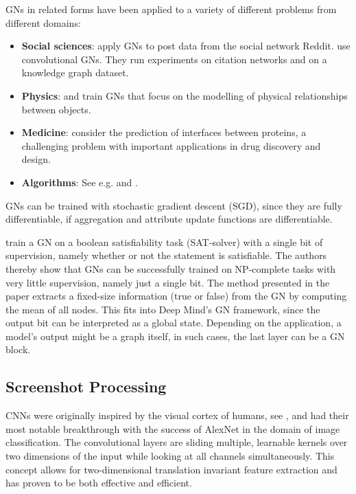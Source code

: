 GNs in related forms have been applied to a variety of different problems from different domains:
\begin{itemize}
    \item \textbf{Social sciences}: \cite{graphnetsreddit} apply GNs to post data from the social network Reddit. \cite{graphnetscitationgraph} use convolutional GNs. They run experiments on citation networks and on a knowledge graph dataset.
    \item \textbf{Physics}: \cite{graphnetsphysicsengine} and \cite{graphnetsphysics2} train GNs that focus on the modelling of physical relationships between objects.
    \item \textbf{Medicine}: \cite{graphnetsproteininterface} consider the prediction of interfaces between proteins, a challenging problem with important applications in drug discovery and design.
    \item \textbf{Algorithms}: See e.g. \cite{selsam:satsolver} and \cite{dai:graphnetscombinatorialalgo}.
\end{itemize}

GNs can be trained with stochastic gradient descent (SGD), since they are fully differentiable, if aggregation and attribute update functions are differentiable.

\cite{selsam:satsolver} train a GN on a boolean satisfiability task (SAT-solver) with a single bit of supervision, namely whether or not the statement is satisfiable. The authors thereby show that GNs can be successfully trained on NP-complete tasks with very little supervision, namely just a single bit. The method presented in the paper extracts a fixed-size information (true or false) from the GN by computing the mean of all nodes. This fits into \cite{deepmind:graphnets} Deep Mind's GN framework, since the output bit can be interpreted as a global state. Depending on the application, a model's output might be a graph itself, in such cases, the last layer can be a GN block.


\subsection{Screenshot Processing}
\label{sec:screenshotprocessing}

CNNs were originally inspired by the visual cortex of humans, see \cite{lecun:lenet}, and had their most notable breakthrough with the success of AlexNet \cite{krizhevsky:imagenet} in the domain of image classification. The convolutional layers are sliding multiple, learnable kernels over two dimensions of the input while looking at all channels simultaneously. This concept allows for two-dimensional translation invariant feature extraction and has proven to be both effective and efficient.


